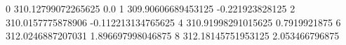 0 310.12799072265625 0.0
1 309.90606689453125 -0.221923828125
2 310.0157775878906 -0.112213134765625
4 310.91998291015625 0.7919921875
6 312.0246887207031 1.896697998046875
8 312.18145751953125 2.053466796875
